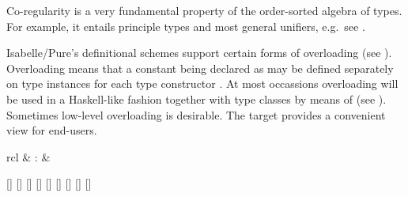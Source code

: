 \begin{isabellebody}
\begin{isamarkuptext}
  \medskip Co-regularity is a very fundamental property of the
  order-sorted algebra of types.  For example, it entails principle
  types and most general unifiers, e.g.\ see \cite{nipkow-prehofer}.%
\end{isamarkuptext}%
\isamarkuptrue%
%
\isamarkuptrue%
%
\begin{isamarkuptext}%
Isabelle/Pure's definitional schemes support certain forms of
  overloading (see ).  Overloading means that a
  constant being declared as  may be
  defined separately on type instances
  for each type constructor .  At most occassions
  overloading will be used in a Haskell-like fashion together with
  type classes by means of \hyperlink{command.instantiation}{\mbox{}} (see
  ).  Sometimes low-level overloading is desirable.
  The \hyperlink{command.overloading}{\mbox{}} target provides a convenient view for
  end-users.

  \begin{matharray}{rcl}
    \hypertarget{command.overloading}{\hyperlink{command.overloading}{\mbox{}}} & : &  \\
  \end{matharray}

  \begin{railoutput}
[]
\rail@plus
{}[]
\rail@bar
{}[]
[]
\rail@endbar
{}[]
\rail@bar
{}
[]
[]
[]
\rail@endbar
{}
\rail@endplus
{}[]
\rail@end
\end{railoutput}



\end{isamarkuptext}
\end{isabellebody}
